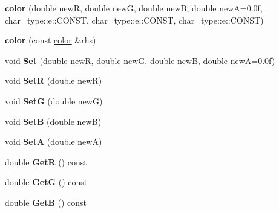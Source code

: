 \begin{DoxyCompactItemize}
\item 
\hypertarget{classmath_1_1color_a84379802543b3319e902f327ac574a15}{
{\bfseries color} (double newR, double newG, double newB, double newA=0.0f, char=type::e::CONST, char=type::e::CONST, char=type::e::CONST)}
\label{classmath_1_1color_a84379802543b3319e902f327ac574a15}

\item 
\hypertarget{classmath_1_1color_a3ecb3c0d622dd10474efb8748860eae1}{
{\bfseries color} (const \hyperlink{classmath_1_1color}{color} \&rhs)}
\label{classmath_1_1color_a3ecb3c0d622dd10474efb8748860eae1}

\item 
\hypertarget{classmath_1_1color_adb32df22da39b686d1c8e6fc96752027}{
void {\bfseries Set} (double newR, double newG, double newB, double newA=0.0f)}
\label{classmath_1_1color_adb32df22da39b686d1c8e6fc96752027}

\item 
\hypertarget{classmath_1_1color_ab84438cd52afdd3183be4679bec9b7b4}{
void {\bfseries SetR} (double newR)}
\label{classmath_1_1color_ab84438cd52afdd3183be4679bec9b7b4}

\item 
\hypertarget{classmath_1_1color_a320161d003f98e933503b9e692aa3227}{
void {\bfseries SetG} (double newG)}
\label{classmath_1_1color_a320161d003f98e933503b9e692aa3227}

\item 
\hypertarget{classmath_1_1color_a9af58b7be02ce7a45df4251ae8dc8d6a}{
void {\bfseries SetB} (double newB)}
\label{classmath_1_1color_a9af58b7be02ce7a45df4251ae8dc8d6a}

\item 
\hypertarget{classmath_1_1color_a44252127bdae3d0f874f0b2da690dfdc}{
void {\bfseries SetA} (double newA)}
\label{classmath_1_1color_a44252127bdae3d0f874f0b2da690dfdc}

\item 
\hypertarget{classmath_1_1color_acf5c8e35f8bc6c38349f719c8d90f288}{
double {\bfseries GetR} () const }
\label{classmath_1_1color_acf5c8e35f8bc6c38349f719c8d90f288}

\item 
\hypertarget{classmath_1_1color_ac1a9c29dd3734e00273224c5f6c9c1ca}{
double {\bfseries GetG} () const }
\label{classmath_1_1color_ac1a9c29dd3734e00273224c5f6c9c1ca}

\item 
\hypertarget{classmath_1_1color_af4deee079cee60f8e4d2a7f0ae9236e2}{
double {\bfseries GetB} () const }
\label{classmath_1_1color_af4deee079cee60f8e4d2a7f0ae9236e2}


\end{DoxyCompactItemize}
